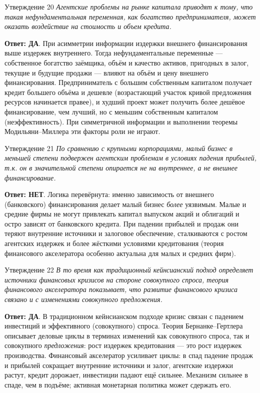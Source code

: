 \documentclass[10pt,a4paper]{article}
\newcommand{\qda}{\textbf{\color{yesgreen}Ответ: ДА}}
\newcommand{\qnet}{\textbf{\color{nored}Ответ: НЕТ}}
\newenvironment{answer}[2]{%
  \begin{qbox}{Утверждение #1}
  \textit{#2}\par\smallskip
}{%
  \end{qbox}\vspace{2pt}
}
\begin{document}
\begin{answer}{20}{Агентские проблемы на рынке капитала приводят к тому, что такая нефундаментальная переменная, как богатство предпринимателя, может оказать воздействие на стоимость и объем кредита.}
\qda. При асимметрии информации издержки внешнего финансирования выше издержек внутреннего. Тогда нефундаментальные переменные --- собственное богатство заёмщика, объём и качество активов, пригодных в залог, текущие и будущие продажи --- влияют на объём и цену внешнего финансирования. Предприниматель с большим собственным капиталом получает кредит большего объёма и дешевле (возрастающий участок кривой предложения ресурсов начинается правее), и худший проект может получить более дешёвое финансирование, чем лучший, но с меньшим собственным капиталом (неэффективность). При симметричной информации и выполнении теоремы Модильяни--Миллера эти факторы роли не играют.
\end{answer}

\begin{answer}{21}{По сравнению с крупными корпорациями, малый бизнес в меньшей степени подвержен агентским проблемам в условиях падения прибылей, т.к. он в значительной степени опирается не на внутреннее, а не внешнее финансирование.}
\qnet. Логика перевёрнута: именно зависимость от внешнего (банковского) финансирования делает малый бизнес \emph{более} уязвимым. Малые и средние фирмы не могут привлекать капитал выпуском акций и облигаций и остро зависят от банковского кредита. При падении прибылей и продаж они теряют внутренние источники и залоговое обеспечение, сталкиваются с ростом агентских издержек и более жёсткими условиями кредитования (теория финансового акселератора особенно актуальна для малых и средних фирм).
\end{answer}

\begin{answer}{22}{В то время как традиционный кейнсианский подход определяет источники финансовых кризисов на стороне совокупного спроса, теория финансового акселератора показывает, что развитие финансового кризиса связано и с изменениями совокупного предложения.}
\qda. В традиционном кейнсианском подходе кризис связан с падением инвестиций и эффективного (совокупного) спроса. Теория Бернанке--Гертлера описывает деловые циклы в терминах изменений как совокупного спроса, так и совокупного \emph{предложения}: рост издержек кредитования --- это рост издержек производства. Финансовый акселератор усиливает циклы: в спад падение продаж и прибылей сокращает внутренние источники и залог, агентские издержки растут, кредит дорожает, инвестиции падают ещё сильнее. Механизм сильнее в спаде, чем в подъёме; активная монетарная политика может сдержать его.
\end{answer}
\end{document}
